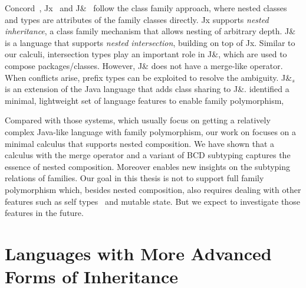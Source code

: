 Concord~\citep{jolly2004simple}, Jx~\citep{Nystrom_2004} and
J\&~\citep{Nystrom:2006} follow the class family approach, where nested classes
and types are attributes of the family classes directly.
Jx supports \textit{nested inheritance}, a class family mechanism that allows
nesting of arbitrary depth. J\& is a language that supports \textit{nested
  intersection}, building on top of Jx. Similar to our calculi, intersection
types play an important role in J\&, which are used to compose packages/classes.
However, J\& does not have a merge-like operator. When conflicts arise, prefix
types can be exploited to resolve the ambiguity. J\&$_s$~\citep{Qi:2009} is an
extension of the Java language that adds class sharing to J\&.
\citet{SAITO_2007} identified a minimal, lightweight set of language features to
enable family polymorphism,

Compared with those systems, which usually focus on getting a relatively complex
Java-like language with family polymorphism, our work on \namee focuses on a
minimal calculus that supports nested composition. We have shown that a calculus
with the merge operator and a variant of BCD subtyping captures the essence of nested
composition. Moreover \namee enables new insights on the subtyping relations of
families. Our goal in this thesis is not to support full family polymorphism
which, besides nested composition, also requires dealing with other features
such as self types~\citep{bruce95thistype,saito09matching} and mutable state.
But we expect to investigate those features in the future.




\section{Languages with More Advanced Forms of Inheritance}

